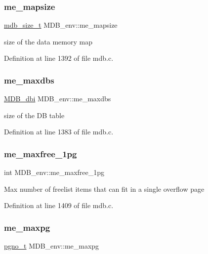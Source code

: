 \subsubsection{\texorpdfstring{me\+\_\+mapsize}{me\_mapsize}}
{\footnotesize\ttfamily \mbox{\hyperlink{lmdb_8h_a78821971e612e3898ef4b3ae45ed86f1}{mdb\+\_\+size\+\_\+t}} M\+D\+B\+\_\+env\+::me\+\_\+mapsize}

size of the data memory map 

Definition at line 1392 of file mdb.\+c.

\mbox{\label{struct_m_d_b__env_ad34d8970e43557e28d1db2df5ffc6d8c}} 
\subsubsection{\texorpdfstring{me\+\_\+maxdbs}{me\_maxdbs}}
{\footnotesize\ttfamily \mbox{\hyperlink{group__mdb_gadbe68a06c448dfb62da16443d251a78b}{M\+D\+B\+\_\+dbi}} M\+D\+B\+\_\+env\+::me\+\_\+maxdbs}

size of the DB table 

Definition at line 1383 of file mdb.\+c.

\mbox{\label{struct_m_d_b__env_aa428623a5a2731349c49a611fddd3d73}} 
\subsubsection{\texorpdfstring{me\+\_\+maxfree\+\_\+1pg}{me\_maxfree\_1pg}}
{\footnotesize\ttfamily int M\+D\+B\+\_\+env\+::me\+\_\+maxfree\+\_\+1pg}

Max number of freelist items that can fit in a single overflow page 

Definition at line 1409 of file mdb.\+c.

\mbox{\label{struct_m_d_b__env_a898e1efb92a2cdfe352dfdb6f6dfbc40}} 
\subsubsection{\texorpdfstring{me\+\_\+maxpg}{me\_maxpg}}
{\footnotesize\ttfamily \mbox{\hyperlink{group__internal_gadb65f0424c9d3827bf6409087ad555cd}{pgno\+\_\+t}} M\+D\+B\+\_\+env\+::me\+\_\+maxpg}

